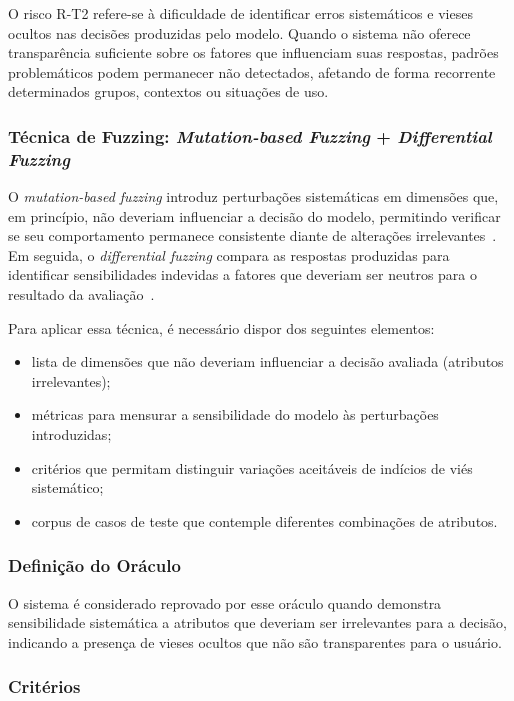 O risco R-T2 refere-se à dificuldade de identificar erros sistemáticos e vieses ocultos nas decisões produzidas pelo modelo. Quando o sistema não oferece transparência suficiente sobre os fatores que influenciam suas respostas, padrões problemáticos podem permanecer não detectados, afetando de forma recorrente determinados grupos, contextos ou situações de uso.

\subsubsection{Técnica de Fuzzing: \textit{Mutation-based Fuzzing} + \textit{Differential Fuzzing}}

O \textit{mutation-based fuzzing} introduz perturbações sistemáticas em dimensões que, em princípio, não deveriam influenciar a decisão do modelo, permitindo verificar se seu comportamento permanece consistente diante de alterações irrelevantes~\cite{Manes2021}. Em seguida, o \textit{differential fuzzing} compara as respostas produzidas para identificar sensibilidades indevidas a fatores que deveriam ser neutros para o resultado da avaliação~\cite{McKeeman1998}.

Para aplicar essa técnica, é necessário dispor dos seguintes elementos:

\begin{itemize}
    \item lista de dimensões que não deveriam influenciar a decisão avaliada (atributos irrelevantes);
    \item métricas para mensurar a sensibilidade do modelo às perturbações introduzidas;
    \item critérios que permitam distinguir variações aceitáveis de indícios de viés sistemático;
    \item corpus de casos de teste que contemple diferentes combinações de atributos.
\end{itemize}

\subsubsection{Definição do Oráculo}

O sistema é considerado reprovado por esse oráculo quando demonstra sensibilidade sistemática a atributos que deveriam ser irrelevantes para a decisão, indicando a presença de vieses ocultos que não são transparentes para o usuário.

\subsubsection{Critérios}

